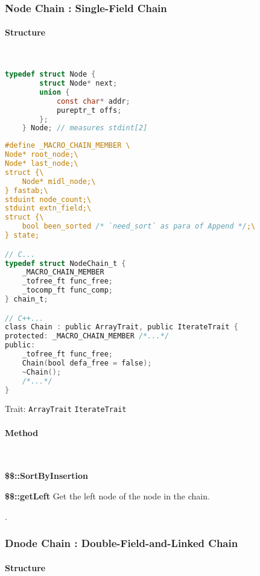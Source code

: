 \subsubsection{Node Chain : Single-Field Chain}

\paragraph{Structure} \

\lstset{style=GlobalC}
\begin{lstlisting}[language=C]
	typedef struct Node {
		struct Node* next;
		union {
			const char* addr;
			pureptr_t offs;
		};
	} Node; // measures stdint[2]
\end{lstlisting}

\lstset{style=GlobalC}
\begin{lstlisting}[language=C]
#define _MACRO_CHAIN_MEMBER \
Node* root_node;\
Node* last_node;\
struct {\
	Node* midl_node;\
} fastab;\
stduint node_count;\
stduint extn_field;\
struct {\
	bool been_sorted /* `need_sort` as para of Append */;\
} state;

// C...
typedef struct NodeChain_t {
	_MACRO_CHAIN_MEMBER
	_tofree_ft func_free;
	_tocomp_ft func_comp;
} chain_t;

// C++...
class Chain : public ArrayTrait, public IterateTrait {
protected: _MACRO_CHAIN_MEMBER /*...*/
public:
	_tofree_ft func_free;
	Chain(bool defa_free = false);
	~Chain();
	/*...*/
}

\end{lstlisting}
Trait:  \verb|ArrayTrait| \verb|IterateTrait|

\paragraph{Method} \

\textbf{\$\$::SortByInsertion}

\textbf{\$\$::getLeft}
Get the left node of the node in the chain.



.

\subsubsection{Dnode Chain : Double-Field-and-Linked Chain}

\paragraph{Structure} \

